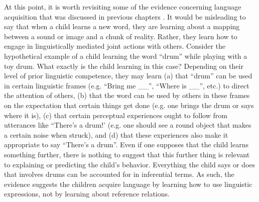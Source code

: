 At this point, it is worth revisiting some of the evidence concerning language acquisition that was discussed in previous chapters \citep[e.g.][]{Miller:2006,Bloom:2001,Tomasello:2001,Tomasello:2005}. It would be misleading to say that when a child learns a new word, they are learning about a mapping between a sound or image and a chunk of reality. Rather, they learn how to engage in linguistically mediated joint actions with others. Consider the hypothetical example of a child learning the word ``drum'' while playing with a toy drum. What exactly is the child learning in this case? Depending on their level of prior linguistic competence, they may learn (a) that ``drum'' can be used in certain linguistic frames (e.g. ``Bring me \_\_'', ``Where is \_\_'', etc.) to direct the attention of others, (b) that the word can be used by others in these frames on the expectation that certain things get done (e.g. one brings the drum or says where it is), (c) that certain perceptual experiences ought to follow from utterances like ``There's a drum!' (e.g. one should see a round object that makes a certain noise when struck), and (d) that these experiences also make it appropriate to say ``There's a drum''. Even if one supposes that the child learns something further, there is nothing to suggest that this further thing is relevant to explaining or predicting the child's behavior. Everything the child says or does that involves drums can be accounted for in inferential terms. As such, the evidence suggests the children acquire language by learning how to use linguistic expressions, not by learning about reference relations.

